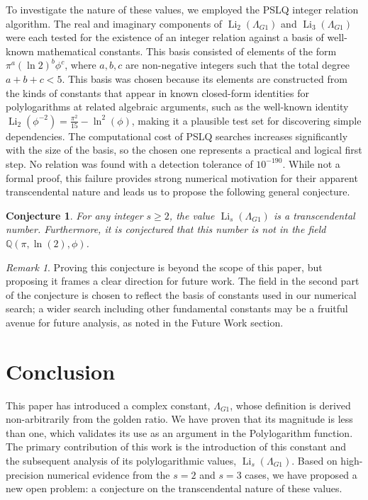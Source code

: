 \documentclass{amsart}
\theoremstyle{plain}
\newtheorem{conjecture}[theorem]{Conjecture}
\theoremstyle{definition}
\theoremstyle{remark}
\newtheorem*{remark}{Remark}
\DeclareMathOperator{\Li}{Li} %
\newcommand{\LambdaG}{\Lambda_{G1}}
\newcommand{\phiG}{\phi}
\begin{document}
To investigate the nature of these values, we employed the PSLQ integer relation algorithm. The real and imaginary components of $\Li_2(\LambdaG)$ and $\Li_3(\LambdaG)$ were each tested for the existence of an integer relation against a basis of well-known mathematical constants. This basis consisted of elements of the form $\pi^a (\ln 2)^b \phiG^c$, where $a,b,c$ are non-negative integers such that the total degree $a+b+c < 5$. This basis was chosen because its elements are constructed from the kinds of constants that appear in known closed-form identities for polylogarithms at related algebraic arguments, such as the well-known identity $\Li_2(\phiG^{-2})=\frac{\pi^{2}}{15}-\ln^{2}(\phiG)$, making it a plausible test set for discovering simple dependencies. The computational cost of PSLQ searches increases significantly with the size of the basis, so the chosen one represents a practical and logical first step. No relation was found with a detection tolerance of $10^{-190}$. While not a formal proof, this failure provides strong numerical motivation for their apparent transcendental nature and leads us to propose the following general conjecture.

\begin{conjecture}
For any integer $s \ge 2$, the value $\Li_s(\LambdaG)$ is a transcendental number. Furthermore, it is conjectured that this number is not in the field $\mathbb{Q}(\pi, \ln(2), \phiG)$.
\end{conjecture}
\begin{remark}
Proving this conjecture is beyond the scope of this paper, but proposing it frames a clear direction for future work. The field in the second part of the conjecture is chosen to reflect the basis of constants used in our numerical search; a wider search including other fundamental constants may be a fruitful avenue for future analysis, as noted in the Future Work section.
\end{remark}

\section{Conclusion}
This paper has introduced a complex constant, $\LambdaG$, whose definition is derived non-arbitrarily from the golden ratio. We have proven that its magnitude is less than one, which validates its use as an argument in the Polylogarithm function. The primary contribution of this work is the introduction of this constant and the subsequent analysis of its polylogarithmic values, $\Li_s(\LambdaG)$. Based on high-precision numerical evidence from the $s=2$ and $s=3$ cases, we have proposed a new open problem: a conjecture on the transcendental nature of these values.
\end{document}
